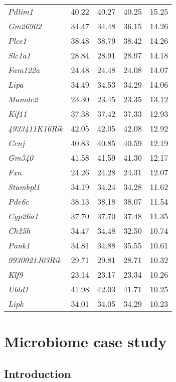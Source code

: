 \documentclass{book}
\begin{document}
\begin{table}[ht]
\begin{tabular}{>{\em}lrrrr}
  Pdlim1 & 40.22 & 40.27 & 40.25 & 15.25 \\
  Gm26902 & 34.47 & 34.48 & 36.15 & 14.26 \\
  Plce1 & 38.48 & 38.79 & 38.42 & 14.26 \\
  Slc1a1 & 28.84 & 28.91 & 28.97 & 14.18 \\
  Fam122a & 24.48 & 24.48 & 24.08 & 14.07 \\
  Lipa & 34.49 & 34.53 & 34.29 & 14.06 \\
  Mamdc2 & 23.30 & 23.45 & 23.35 & 13.12 \\
  Kif11 & 37.38 & 37.42 & 37.33 & 12.93 \\
  4933411K16Rik & 42.05 & 42.05 & 42.08 & 12.92 \\
  Ccnj & 40.83 & 40.85 & 40.59 & 12.19 \\
  Gm340 & 41.58 & 41.59 & 41.30 & 12.17 \\
  Fxn & 24.26 & 24.28 & 24.31 & 12.07 \\
  Stambpl1 & 34.19 & 34.24 & 34.28 & 11.62 \\
  Pde6c & 38.13 & 38.18 & 38.07 & 11.54 \\
  Cyp26a1 & 37.70 & 37.70 & 37.48 & 11.35 \\
  Ch25h & 34.47 & 34.48 & 32.50 & 10.74 \\
  Pank1 & 34.81 & 34.88 & 35.55 & 10.61 \\
  9930021J03Rik & 29.71 & 29.81 & 28.71 & 10.32 \\
  Klf9 & 23.14 & 23.17 & 23.34 & 10.26 \\
  Ubtd1 & 41.98 & 42.03 & 41.71 & 10.25 \\
  Lipk & 34.01 & 34.05 & 34.29 & 10.23 \\
   \hline
\end{tabular}
\endgroup
\end{table}




\section{Microbiome case study}
\subsection{Introduction}
\end{document}
